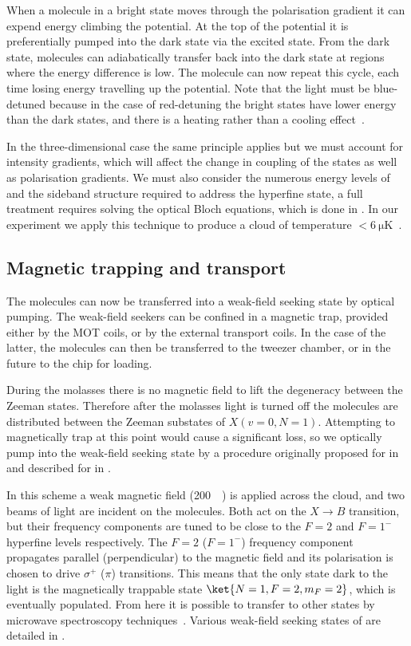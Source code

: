 When a molecule in a bright state moves through the polarisation gradient it
can expend energy climbing the potential. At the top of the potential it is
preferentially pumped into the dark state via the excited state. From the dark
state, molecules can adiabatically transfer back into the dark state at regions
where the energy difference is low. The molecule can now repeat this cycle,
each time losing energy travelling up the potential. Note that the light must
be blue-detuned because in the case of red-detuning the bright states have
lower energy than the dark states, and there is a heating rather than a cooling
effect~\cite{1367-2630-18-12-123017}.

In the three-dimensional case the same principle applies but we must account
for intensity gradients, which will affect the change in coupling of the states
as well as polarisation gradients. We must also consider the numerous energy
levels of \CaF{} and the sideband structure required to address the hyperfine
state, a full treatment requires solving the optical Bloch equations, which is
done in . In our experiment we apply this
technique to produce a \CaF{} cloud of temperature
$<\SI{6}{\micro\kelvin}$~\cite{PhysRevLett.123.033202}.

\subsection{Magnetic trapping and transport}

The molecules can now be transferred into a weak-field seeking state by optical
pumping. The weak-field seekers can be confined in a magnetic trap, provided
either by the MOT coils, or by the external transport coils. In the case of the
latter, the molecules can then be transferred to the tweezer chamber, or in the
future to the chip for loading.

During the molasses there is no magnetic field to lift the degeneracy between
the Zeeman states. Therefore after the molasses light is turned off the
molecules are distributed between the Zeeman substates of $X(v=0, N=1)$.
Attempting to magnetically trap at this point would cause a significant loss,
so we optically pump into the weak-field seeking state by a procedure originally
proposed for \SrF{} in \inlineref{} %
and described for \CaF{} in .

In this scheme a weak magnetic field (\SI{200}{\milli\gauss}) is applied across
the cloud, and two beams of light are incident on the molecules. Both act on
the $X\rightarrow B$ transition, but their frequency components are tuned to be
close to the $F=2$ and $F=1^-$ hyperfine levels respectively. The $F=2$
($F=1^-$) frequency component propagates parallel (perpendicular) to the
magnetic field and its polarisation is chosen to drive $\sigma^+$ ($\pi$)
transitions. This means that the only state dark to the light is the
magnetically trappable state $\ket{N=1, F=2, m_F=2}$, which is eventually
populated. From here it is possible to transfer to other states by microwave
spectroscopy techniques~\cite{WilliamsMagnetic2018}. Various weak-field seeking
states of \CaF{} are detailed in .


